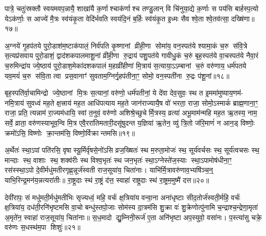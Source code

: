 पात्रे॒ चतुः॑स्रक्तौ स्वयमवप॒न्नायै॒ शाखा॑यै क॒र्णाश्चाक॑र्णाश्च तण्डु॒लान् वि चि॑नुया॒द्ये क॒र्णाः स पय॑सि बार्\mbox{}हस्प॒त्यो येऽक॑र्णाः॒ स आज्ये॑ मै॒त्रः स्व॑यंकृ॒ता वेदि॑र्भवति स्वयंदि॒नं ब॒र्\mbox{}हिः स्व॑यंकृ॒त इ॒ध्मः सैव श्वे॒ता श्वे॒तव॑त्सा॒ दख्षि॑णा॥१७॥

{\anuvakamend[{सा॒वि॒त्रं द्वाद॑शकपाल॒माश्व॑त्थे॒ त्रय॑स्त्रिशच्च॥९॥}]}

अ॒ग्नये॑ गृ॒हप॑तये पुरो॒डाश॑म॒ष्टाक॑पालं॒ निर्व॑पति कृ॒ष्णानां व्रीही॒णा सोमा॑य॒ वन॒स्पत॑ये श्यामा॒कं च॒रु स॑वि॒त्रे स॒त्यप्र॑सवाय पुरो॒डाशं॒ द्वाद॑शकपालमाशू॒नां व्री॑ही॒णा रु॒द्राय॑ पशु॒पत॑ये गावीधु॒कं च॒रुं बृह॒स्पत॑ये वा॒चस्पत॑ये नैवा॒रं च॒रुमिन्द्रा॑य ज्ये॒ष्ठाय॑ पुरो॒डाश॒मेका॑दशकपालं म॒हाव्री॑हीणां मि॒त्राय॑ स॒त्याया॒ऽऽम्बानां च॒रुं वरु॑णाय॒ धर्म॑पतये यव॒मयं॑ च॒रु स॑वि॒ता त्वा प्रस॒वानाꣳ॑ सुवताम॒ग्निर्गृ॒हप॑तीना॒ꣳ॒ सोमो॒ वन॒स्पती॑ना रु॒द्रः प॑शू॒नां॥१८॥

बृह॒स्पति॑र्वा॒चामिन्द्रो ज्ये॒ष्ठानां मि॒त्रः स॒त्यानां॒ वरु॑णो॒ धर्म॑पतीनां॒ ये दे॑वा देव॒सुवः॒ स्थ त इ॒ममा॑मुष्याय॒णम॑- नमि॒त्राय॑ सुवध्वं मह॒ते क्ष॒त्त्राय॑ मह॒त आधि॑पत्याय मह॒ते जान॑राज्यायै॒ष वो॑ भरता॒ राजा॒ सोमो॒ऽस्माकं॑ ब्राह्म॒णाना॒ꣳ॒ राजा॒ प्रति॒ त्यन्नाम॑ रा॒ज्यम॑धायि॒ स्वां त॒नुवं॒ वरु॑णो अशिश्रे॒च्छुचेर्मि॒त्रस्य॒ व्रत्या॑ अभू॒माम॑न्महि मह॒त ऋ॒तस्य॒ नाम॒ सर्वे॒ व्राता॒ वरु॑णस्याभूव॒न्वि मि॒त्र एवै॒ररा॑तिमतारी॒दसू॑षुदन्त य॒ज्ञिया॑ ऋ॒तेन॒ व्यु॑ त्रि॒तो ज॑रि॒माणं॑ न आन॒ड् विष्णोः॒ क्रमो॑ऽसि॒ विष्णोः क्रा॒न्तम॑सि॒ विष्णो॒र्विक्रान्तमसि॥१९॥

{\anuvakamend[{प॒शू॒नां व्राताः॒ पञ्च॑विशतिश्च॥10॥}]}

अ॒र्थेतः॑ स्था॒ऽपां पति॑रसि॒ वृषास्यू॒र्मिर्वृ॑षसे॒नो॑ऽसि व्रज॒ख्षितः॑ स्थ म॒रुता॒मोजः॑ स्थ॒ सूर्य॑वर्चसः स्थ॒ सूर्य॑त्वचसः स्थ॒ मान्दाः स्थ॒ वाशाः स्थ॒ शक्व॑रीः स्थ विश्व॒भृतः॑ स्थ जन॒भृतः॑ स्था॒ऽग्नेस्ते॑ज॒स्याः स्था॒ऽपामोष॑धीना॒ꣳ॒ रस॑स्स्था॒ऽपो दे॒वीर्मधु॑मतीरगृह्ण॒न्नूर्ज॑स्वती राज॒सूया॑य॒ चिता॑नाः। याभि॑र्मि॒त्रावरु॑णाव॒भ्यषि॑ञ्च॒न्॒ याभि॒रिन्द्र॒मन॑य॒न्नत्यरा॑तीः॥ रा॒ष्ट्र॒दाः स्थ॑ रा॒ष्ट्रं द॑त्त॒ स्वाहा॑ राष्ट्र॒दाः स्थ॑ रा॒ष्ट्रम॒मुष्मै॑ दत्त॥२०॥

{\anuvakamend[{अत्येका॑दश च॥11॥}]}

देवी॑रापः॒ सं मधु॑मती॒र्मधु॑मतीभिः सृज्यध्वं॒ महि॒ वर्चः॑ क्ष॒त्रिया॑य वन्वा॒ना अना॑धृष्टाः सीद॒तोर्ज॑स्वती॒र्महि॒ वर्चः॑ क्ष॒त्रिया॑य॒ दध॑ती॒रनि॑भृष्टमसि वा॒चो बन्धु॑स्तपो॒जाः सोम॑स्य दा॒त्रम॑सि शु॒क्रा वः॑ शु॒क्रेणोत्पु॑नामि च॒न्द्राश्च॒न्द्रेणा॒मृता॑ अ॒मृते॑न॒ स्वाहा॑ राज॒सूया॑य॒ चिता॑नाः॥ स॒ध॒मादो द्यु॒म्निनी॒रूर्ज॑ ए॒ता अनि॑भृष्टा अप॒स्युवो॒ वसा॑नः। प॒स्त्या॑सु चक्रे॒ वरु॑णः स॒धस्थ॑म॒पा शिशुः॑॥२१॥

